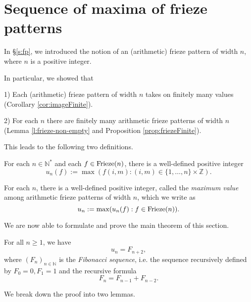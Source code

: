 \chapter{Sequence of maxima of frieze patterns}
In \S \ref{s:fp}, we introduced the notion of an (arithmetic) frieze pattern of width $n$, where $n$ is a positive integer.

In particular, we showed that 

1) Each (arithmetic) frieze pattern of width $n$ takes on finitely many values (Corollary \ref{cor:imageFinite}). 

2) For each $n$ there are finitely many arithmetic frieze patterns of width $n$ (Lemma \ref{l:frieze-non-empty} and 
Proposition \ref{prop:friezeFinite}).

This leads to the following two definitions.
\begin{definition}
    \label{def:un(f)}
For each $n \in \mathbb{N}^*$ and each $f \in {\rm Frieze}(n)$, there is a well-defined positive integer
\[
    u_n(f) := \max ( f (i,m) : (i,m)  \in \{1,\ldots,n \}\times \mathbb{Z}).
\]
\end{definition}

\begin{definition}
    \label{def:un}
    For each $n$, there is a well-defined
    positive integer, called the {\it maximum value} among arithmetic frieze patterns of width $n$, which we write as
    \[
        u_n := \max (u_n(f) : f \in  {\rm Frieze}(n)).
    \]
\end{definition}


We are now able to formulate and prove the main theorem of this section.
\begin{theorem}
    \label{MainTheorem}
    For all $n \geq 1$, we have 
    \[
        u_n = F_{n+2},
    \]
    where $(F_{n})_{n \in \mathbb{N}}$ is the {\it Fibonacci sequence}, i.e. the sequence recursively defined by 
    $F_0 = 0, F_1 = 1$ and the recursive formula
    \[
        F_n = F_{n-1} + F_{n-2}.
    \]
\end{theorem}
We break down the proof into two lemmas. 


